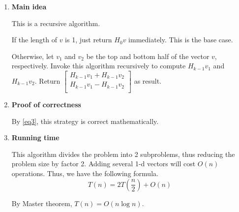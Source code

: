 \documentclass[11pt]{article}
\begin{document}
\begin{enumerate}
	\renewcommand{\theenumii}{\roman{enumii}}
	\begin{enumerate}
		\item \textbf{Main idea}
		
		This is a recursive algorithm. 
		
		If the length of $v$ is 1, just return $H_0v$ immediately. This is the base case.
		
		Otherwise, let $v_1$ and $v_2$ be the top and bottom half of the vector $v$, respectively. Invoke this algorithm recursively to compute $H_{k-1}v_1$ and $H_{k-1}v_2$. Return $									\begin{bmatrix} 
					H_{k-1}v_1  + H_{k-1}v_2\\ 
					H_{k-1}v_1  -  H_{k-1}v_2 \\ 
				\end{bmatrix}$ as result.
		\item \textbf{Proof of correctness}
		
		By \eqref{eq3}, this strategy is correct mathematically.
		\item \textbf{Running time}
		
		This algorithm divides the problem into 2 subproblems, thus reducing the problem size by factor 2. Adding several 1-d vectors will cost $O(n)$ operations. Thus, we have the following formula.
		\[
			T(n) = 2T(\frac{n}{2}) + O(n)
		\]
		
		By Master theorem, $T(n) = O(n\log n)$.
		
	\end{enumerate}
\end{enumerate}

 \newpage
\end{document}
